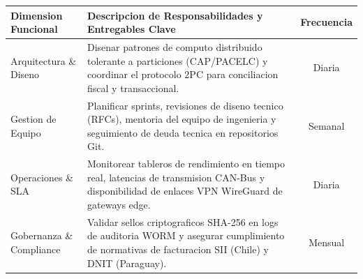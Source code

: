 \documentclass[11pt,a4paper]{article}
\begin{document}
\clearpage


\drawchromaticbar[3.5pt]
\vspace{2.5mm}

\vspace{1mm}

\noindent
\begin{tabularx}{\linewidth}{@{} p{3.2cm} X c @{}}
  \toprule
  \rowcolor{corpDarkHeader}
  {\bfseries\color{white}\scriptsize Dimension Funcional} &
  {\bfseries\color{white}\scriptsize Descripcion de Responsabilidades y Entregables Clave} &
  {\bfseries\color{white}\scriptsize Frecuencia} \\
  \midrule
  \rowcolor{corpLightBg}
  Arquitectura \& Diseno & Disenar patrones de computo distribuido tolerante a particiones (CAP/PACELC) y coordinar el protocolo 2PC para conciliacion fiscal y transaccional. & Diaria \\
  Gestion de Equipo & Planificar sprints, revisiones de diseno tecnico (RFCs), mentoria del equipo de ingenieria y seguimiento de deuda tecnica en repositorios Git. & Semanal \\
  \rowcolor{corpLightBg}
  Operaciones \& SLA & Monitorear tableros de rendimiento en tiempo real, latencias de transmision CAN-Bus y disponibilidad de enlaces VPN WireGuard de gateways edge. & Diaria \\
  Gobernanza \& Compliance & Validar sellos criptograficos SHA-256 en logs de auditoria WORM y asegurar cumplimiento de normativas de facturacion SII (Chile) y DNIT (Paraguay). & Mensual \\
  \bottomrule
\end{tabularx}

\vspace{2.5mm}

\vspace{1mm}
\end{document}

